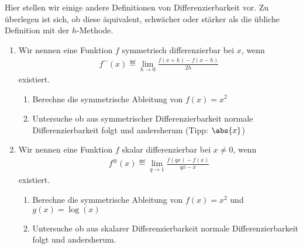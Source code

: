 \begin{exercise}
  Hier stellen wir einige andere Definitionen von Differenzierbarkeit vor. Zu
  überlegen ist sich, ob diese äquivalent, schwächer oder stärker als die
  übliche Definition mit der $h$-Methode.
  \begin{enumerate}[label=(\alph*)]
  \item Wir nennen eine Funktion $f$ symmetrisch differenzierbar bei $x$, wenn
    \begin{equation*}
      \begin{split}
        f^\sim(x) \eqdef \lim_{h \to 0}{\frac{f(x + h) - f(x-h)}{2h}}
      \end{split}
    \end{equation*}
    existiert.
    \begin{enumerate}[label=(\roman*)]
    \item Berechne die symmetrische Ableitung von $f(x) = x^2$
    \item Untersuche ob aus symmetrischer Differenzierbarkeit normale
      Differenzierbarkeit folgt und andersherum (Tipp: $\abs{x}$)
    \end{enumerate}

  \item Wir nennen eine Funktion $f$ skalar differenzierbar bei $x \neq 0$, wenn
    \begin{equation*}
      \begin{split}
        f^\circledast(x) \eqdef \lim_{q \to 1}{\frac{f(qx) - f(x)}{qx - x}}
      \end{split}
    \end{equation*}
    existiert.
    \begin{enumerate}[label=(\roman*)]
    \item Berechne die symmetrische Ableitung von $f(x) = x^2$ und
      $g(x) = \log (x)$
    \item Untersuche ob aus skalarer Differenzierbarkeit normale
      Differenzierbarkeit folgt und andersherum.
    \end{enumerate}
  \end{enumerate}
\end{exercise}

